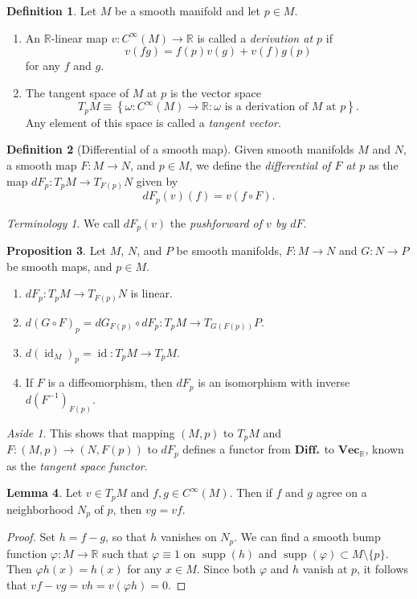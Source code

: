 \documentclass[10pt,letterpaper,cm]{nupset}
\theoremstyle{definition}
\newtheorem{definition}{Definition}[subsection]
\theoremstyle{theorem}
\newtheorem{lemma}[definition]{Lemma}
\newtheorem{prop}[definition]{Proposition}
\theoremstyle{remark}
\newtheorem*{aside}{Aside}
\newtheorem*{term}{Terminology}
\newcommand{\R}{\mathbb R}
\newcommand{\1}{\mathbf{1}}
\newcommand{\0}{\vec 0}
\DeclareMathOperator{\id}{id}
\DeclareMathOperator{\supp}{supp}
\begin{document}
\begin{definition} Let $M$ be a smooth manifold and let $p\in M$.
\begin{enumerate}
\item An $\R$-linear map $v: C^{\infty}(M) \to \R$ is called a \textit{derivation at $p$} if $$v(fg) = f(p)v(g) + v(f)g(p)$$ for any $f$ and $g$.
\item The tangent space of $M$ at $p$ is the vector space
$$T_pM \equiv \left\{\omega : C^{\infty}(M) \to \R : \omega \text{ is a derivation of $M$ at }p\right\}.$$ Any element of this space is called a \textit{tangent vector}.
\end{enumerate}
\end{definition}

\begin{definition}[Differential of a smooth map]
Given smooth manifolds $M$ and $N$, a smooth map $F: M \to N$, and $p\in M$,  we define the \textit{differential of $F$ at $p$} as the map $dF_p: T_pM \to T_{F(p)}N$ given by $$dF_p(v)(f) = v(f \circ F).$$
\end{definition}

\begin{term}
We call $dF_p(v)$ the \textit{pushforward of $v$ by $dF$}.
\end{term}

\begin{prop}
Let $M$, $N$, and $P$ be  smooth manifolds, $F: M \to N$ and $G: N \to P$ be smooth maps, and $p\in M$. 
\begin{enumerate}
\item $dF_p: T_pM \to T_{F(p)}N$ is linear. 
\item $d(G \circ F)_p = dG_{F(p)} \circ dF_p : T_pM \to T_{G(F(p))}P$.
\item $d(\id_M)_p = \id : T_pM \to T_pM$.
\item If $F$ is a diffeomorphism, then $dF_p$ is an isomorphism with inverse $d(F^{-1})_{F(p)}$.
\end{enumerate}
\end{prop}

\begin{aside}
This shows that mapping $\left(M, p\right)$ to $T_pM$ and $F: \left(M, p\right) \to \left(N, F(p)\right)$ to $dF_p$ defines a functor from $\mathbf{Diff}_{\ast}$ to $\mathbf{Vec}_{\R}$, known as the \textit{tangent space functor}.
\end{aside}

\begin{lemma}
Let $v \in T_pM$ and $f, g\in C^{\infty}(M)$. Then if $f$ and $g$ agree on a neighborhood $N_p$ of $p$, then $vg = vf$. 
\end{lemma}
\begin{proof}
Set $h = f-g$, so that $h$ vanishes on $N_p$. We can find a smooth bump function $\varphi: M \to \R$ such that $\varphi \equiv 1$ on $\supp(h)$ and $\supp(\varphi) \subset M \setminus \{p\}$. Then $\varphi h(x) = h(x)$ for any $x\in M$. Since both $\varphi$ and $h$ vanish at $p$, it follows that $vf -vg = vh = v(\varphi h) = 0.$
\end{proof}
\end{document}
